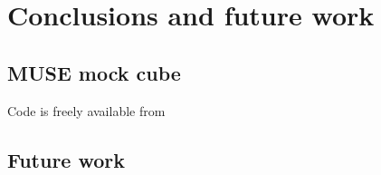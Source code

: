 
\chapter{Conclusions and future work}
\label{ch:conclusions}


\section{MUSE mock cube}

Code is freely available from \url{}



\section{Future work}
\label{se:futurework}
